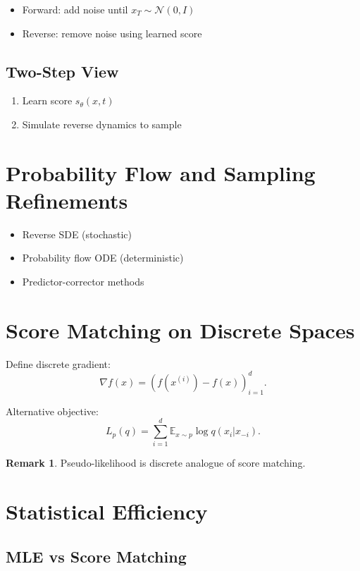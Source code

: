\documentclass[12pt,oneside]{book}
\numberwithin{equation}{section}
\theoremstyle{definition}
\newtheorem{remark}{Remark}[section]
\theoremstyle{plain}
\theoremstyle{remark}
\newcommand{\Normal}{\mathcal{N}}
\begin{document}
\begin{itemize}
    \item Forward: add noise until $x_T \sim \Normal(0,I)$
    \item Reverse: remove noise using learned score
\end{itemize}

\subsection{Two-Step View}

\begin{enumerate}
    \item Learn score $s_\theta(x,t)$
    \item Simulate reverse dynamics to sample
\end{enumerate}

\section{Probability Flow and Sampling Refinements}

\begin{itemize}
    \item Reverse SDE (stochastic)
    \item Probability flow ODE (deterministic)
    \item Predictor-corrector methods
\end{itemize}

\section{Score Matching on Discrete Spaces}

Define discrete gradient:
\[
\nabla f(x) = (f(x^{(i)}) - f(x))_{i=1}^d.
\]

Alternative objective:
\[
L_p(q) = \sum_{i=1}^d \mathbb{E}_{x \sim p} \log q(x_i | x_{-i}).
\]

\begin{remark}
Pseudo-likelihood is discrete analogue of score matching.
\end{remark}

\section{Statistical Efficiency}

\subsection{MLE vs Score Matching}
\end{document}
